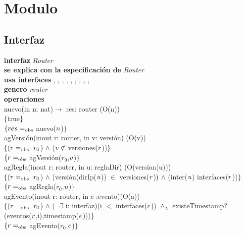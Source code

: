 \section*{Modulo }

\subsection*{Interfaz}
\textbf{interfaz} \textit{Router}\\
\textbf{se explica con la especificaci\'on de} \textit{Router}\\
\textbf{usa interfaces} , , , , , , , , , \\
\textbf{genero} \textit{router}\\

\textbf{operaciones}\\

nuevo(in n: nat)$\rightarrow$ res: router  \hfill(O(n)) \\
$\{$true$\}$\\
$\{{res} =_{\mathrm{obs}}$ nuevo(${n}$)$\}$\\

agVersi\'on(inout r: router, in v: versi\'on) \hfill(O(v))\\
$\{$(${r} =_{\mathrm{obs}}\ r_0$) $\wedge$ (${v} \notin$ versiones(${r}$))$\}$\\
$\{{r} =_{\mathrm{obs}}$ agVersi\'on($r_0$,${v}$)$\}$\\

agRegla(inout r: router, in u: reglaDir) \hfill(O(version(u))) \\
$\{$(${r} =_{\mathrm{obs}}\ r_0$) $\wedge$ (versi\'on(dirIp(${u}$)) $\in$ versiones(${r}$)) $\wedge$ (inter(${u}$) interfaces(${r}$))$\}$\\
$\{{r} =_{\mathrm{obs}}$ agRegla($r_0$,${u}$)$\}$\\

agEvento(inout r: router, in e :evento)\hfill(O(a)) \\
$\{$(${r} =_{\mathrm{obs}}\ r_0$) $\wedge$ ($\neg \exists$ i: interfaz)(i $<$ interfaces(${r}$)) $\wedge_L$ existeTimestamp?(eventos(${r}$,i),timestamp(${e}$)))$\}$\\
$\{{r}=_{\mathrm{obs}}$ agEvento($r_0$,${e}$)$\}$\\

